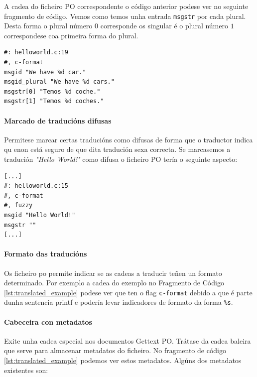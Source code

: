 A cadea do ficheiro PO correspondente o código anterior podese ver no seguinte fragmento de código. Vemos como temos unha entrada \lstinline{msgstr} por cada plural. Desta forma o plural número $0$ corresponde os singular é o plural número $1$ correspondese coa primeira forma do plural.

\begin{lstlisting}[caption=Plurais en GetText (Ficheiro PO).]
#: helloworld.c:19
#, c-format
msgid "We have %d car."
msgid_plural "We have %d cars."
msgstr[0] "Temos %d coche."
msgstr[1] "Temos %d coches."
\end{lstlisting}


\paragraph {Marcado de traducións difusas}
Permitese marcar certas traducións como difusas de forma que o traductor indica qu enon está seguro de que dita tradución sexa correcta. Se marcasemos a tradución \emph{"Hello World!"} como difusa o ficheiro PO tería o seguinte aspecto:

\begin{lstlisting}[label=some-code,caption=Ficheiro POT con comentario.]
[...]
#: helloworld.c:15
#, c-format
#, fuzzy
msgid "Hello World!"
msgstr ""
[...]
\end{lstlisting}

\paragraph {Formato das traducións}
Os ficheiro po permite indicar se as cadeas a traducir teñen un formato determinado. Por exemplo a cadea do exemplo no Fragmento de Código \ref{lst:translated_example} podese ver que ten o flag \lstinline{c-format} debido a que é parte dunha sentencia printf e podería levar indicadores de formato da forma \lstinline{%s}.

\paragraph {Cabeceira con metadatos}
Exite unha cadea especial nos documentos Gettext PO. Trátase da cadea baleira que serve para almacenar metadatos do ficheiro. No fragmento de código \ref{lst:translated_example} podemos ver estos metadatos. Algúns dos metadatos existentes son:

